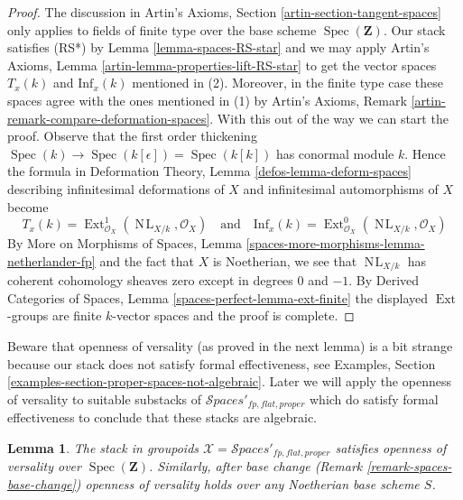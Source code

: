 \documentclass{stacks-project}
\theoremstyle{plain}
\newtheorem{lemma}[subsection]{Lemma}
\theoremstyle{definition}
\theoremstyle{remark}
\numberwithin{equation}{subsection}
\def\Spec{\mathop{\mathrm{Spec}}}
\def\Ext{\mathop{\mathrm{Ext}}\nolimits}
\def\NL{\mathop{N\!L}\nolimits}
\def\Spacesstack{\mathcal{S}\!\mathit{paces}}
\begin{document}
\begin{proof}
The discussion in Artin's Axioms, Section \ref{artin-section-tangent-spaces}
only applies to fields of finite type over the base scheme $\Spec(\mathbf{Z})$.
Our stack satisfies (RS*) by Lemma \ref{lemma-spaces-RS-star}
and we may apply
Artin's Axioms, Lemma \ref{artin-lemma-properties-lift-RS-star}
to get the vector spaces $T_x(k)$ and $\text{Inf}_x(k)$
mentioned in (2). Moreover, in the finite type case these spaces agree with the
ones mentioned in (1)
by Artin's Axioms, Remark \ref{artin-remark-compare-deformation-spaces}.
With this out of the way we can start the proof.
Observe that the first order thickening
$\Spec(k) \to \Spec(k[\epsilon]) = \Spec(k[k])$
has conormal module $k$. Hence the formula in
Deformation Theory, Lemma \ref{defos-lemma-deform-spaces}
describing infinitesimal deformations of $X$ and infinitesimal
automorphisms of $X$ become
$$
T_x(k) = \Ext^1_{\mathcal{O}_X}(\NL_{X/k}, \mathcal{O}_X)
\quad\text{and}\quad
\text{Inf}_x(k) = \Ext^0_{\mathcal{O}_X}(\NL_{X/k}, \mathcal{O}_X)
$$
By More on Morphisms of Spaces, Lemma
\ref{spaces-more-morphisms-lemma-netherlander-fp}
and the fact that $X$ is Noetherian, we see that
$\NL_{X/k}$ has coherent cohomology sheaves zero except
in degrees $0$ and $-1$.
By Derived Categories of Spaces, Lemma \ref{spaces-perfect-lemma-ext-finite}
the displayed $\Ext$-groups are finite $k$-vector spaces
and the proof is complete.
\end{proof}

\noindent
Beware that openness of versality (as proved in the next lemma)
is a bit strange because our stack does not satisfy formal effectiveness, see
Examples, Section \ref{examples-section-proper-spaces-not-algebraic}.
Later we will apply the openness of versality to suitable substacks of
$\Spacesstack'_{fp, flat, proper}$ which do satisfy
formal effectiveness to conclude that these stacks are algebraic.

\begin{lemma}
\label{lemma-spaces-defo-thy}
The stack in groupoids $\mathcal{X} = \Spacesstack'_{fp, flat, proper}$
satisfies openness of versality over $\Spec(\mathbf{Z})$.
Similarly, after base change (Remark \ref{remark-spaces-base-change})
openness of versality holds over any Noetherian base scheme $S$.
\end{lemma}
\end{document}
